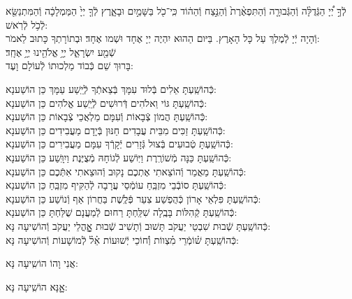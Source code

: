 \documentclass[twoside, openany, parskip=half, 11pt]{book}
\begin{document}
לְֿךָ֣ יְ֠יָ הַגְּֿדֻלָּ֨ה וְֿהַגְּֿבוּרָ֤ה וְֿהַתִּפְאֶ֨רֶת֙ וְֿהַנֵּ֣צַח וְֿהַה֔וֹד
כִּֽי־כֹ֖ל בַּשָּׁמַ֣יִם וּבָאָ֑רֶץ לְֿךָ֤ יְיָ֙ הַמַּמְלָכָ֔ה
וְֿהַמִּתְנַשֵּׂ֖א לְֿכֹ֥ל לְֿרֹֽאשׁ:\\
וְֿהָיָה יְֿיָ לְֿמֶלֶךְ עַל כָּל הָאָרֶץ. בַּיּום הַהוּא יִהְיֶה יְיָ אֶחָד וּשְׁמו אֶחָד׃ וּבְתוֹרָתְךָ כָּתוּב לֵאמֹר: \\
שְֿׁמַ֖ע יִשְׂרָאֵ֑ל יְיָ֥ אֱלֹהֵ֖ינוּ יְיָ֥ אֶחָֽד׃\\
בָּרוּךְ שֵׁם כְּֿבוֹד מַלְכוּתוֹ לְֿעוֹלָם וָעֶד:

\begin{small}
כְּֿהוֹשַֽׁעְתָּ אֵלִים בְּֿלוּד עִמָּךְ בְּֿצֵאתְֿךָ לְֿיֵֽשַׁע עַמָּךְ \hfill כֵּן הוֹשַׁענָא: \\
כְּֿהוֹשַֽׁעְתָּ גּוֹי וֵאלֹהִים דְּֿרוּשִׁים לְֿיֵֽשַׁע אֱלֹהִים \hfill כֵּן הוֹשַׁענָא: \\
כְּֿהוֹשַֽׁעְתָּ הֲמוֹן צְֿבָאוֹת וְֿעִמָּם מַלְאֲכֵי צְֿבָאוֹת \hfill כֵּן הוֹשַׁענָא: \\
כְּֿהוֹשַֽׁעְתָּ זַכִּים מִבֵּית עֲבָדִים חַנּוּן בְּֿיָדָם מַעֲבִידִים \hfill כֵּן הוֹשַׁענָא: \\
כְּֿהוֹשַֽׁעְתָּ טְֿבוּעִים בְּֿצוּל גְּֿזָרִים יְֿקָרְֿךָ עִמָּם מַעֲבִירִים \hfill כֵּן הוֹשַׁענָא: \\
כְּֿהוֹשַֽׁעְתָּ כַּנָּה מְֿשׁוֹרֶֽרֶת וַיּֽוֹשַׁע לְֿגוֹחָהּ מְֿצֻיֶּנֶת וַיִוָּֽשַׁע \hfill כֵּן הוֹשַׁענָא: \\
כְּֿהוֹשַֽׁעְתָּ מַאֲמַר וְֿהוֹצֵאתִי אֶתְכֶם נָקוּב וְֿהוּצֵאתִי אִתְּֿכֶם \hfill כֵּן הוֹשַׁענָא:\\
כְּֿהוֹשַֽׁעְתָּ סוֹבְֿבֵי מִזְבֵּֽחַ עוֹמְֿסֵי עֲרָבָה לְֿהַקִּיף מִזְבֵּֽחַ \hfill כֵּן הוֹשַׁענָא: \\
כְּֿהוֹשַֽׁעְתָּ פִּלְאֵי אָרוֹן כְּֿהֻפְשַׁע צִעֵר פְּֿלֶֽשֶׁת בַּחֲרוֹן אַף וְֿנוֹשַׁע \hfill כֵּן הוֹשַׁענָא: \\
כְּֿהוֹשַֽׁעְתָּ קְֿהִלּוֹת בָּבֶֽלָה שִׁלַּֽחְתָּ רַחוּם לְֿמַעֲנָם שֻׁלַּחְתָּ \hfill כֵּן הוֹשַׁענָא:\\
כְּֿהוֹשַֽׁעְתָּ שְֿׁבוּת שִׁבְטֵי יַעֲקֹב תָּשׁוּב וְֿתָשִׁיב שְֿׁבוּת אׇׇׇׇָהֳלֵי יַעֲקֹב \hfill וְֿהוֹשִׁיעָה נָּא:\\
כְּֿהוֹשַֽׁעְתָּ שׁ֗וֹמְֿרֵי מִ֗צְווֹת וְֿ֗חוֹכֵי יְֿשׁוּעוֹת אֵ֗ל֗ לְֿמוֹשָׁעוֹת \hfill וְֿהוֹשִׁיעָה נָּא:

\end{small}

\begin{large}
\chazzan
אֲנִי וָהוֹ הוֹשִֽיעָה נָּא:

\shatzvkahal
אׇׇָנָּא הוֹשִֽׁיעָה נָּא:

\end{large}
\end{document}

